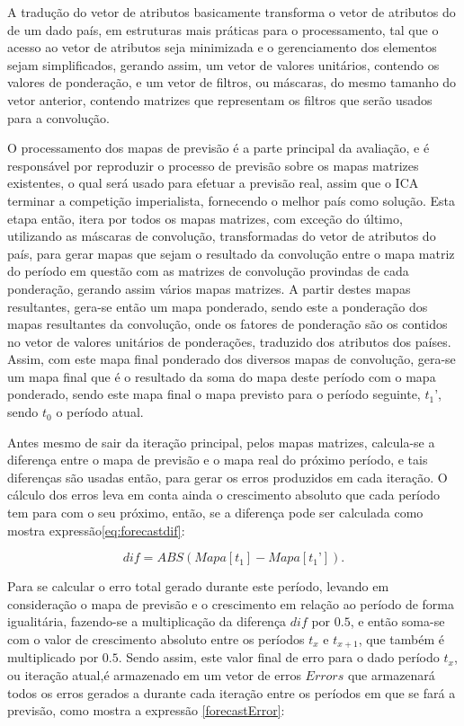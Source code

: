 A tradução do vetor de atributos basicamente transforma o vetor de atributos do de um dado país, em estruturas mais práticas para o processamento, tal que o acesso ao vetor de atributos seja minimizada e o gerenciamento dos elementos sejam simplificados, gerando assim, um vetor de valores unitários, contendo os valores de ponderação, e um vetor de filtros, ou máscaras, do mesmo tamanho do vetor anterior, contendo matrizes que representam os filtros que serão usados para a convolução.   

O processamento dos mapas de previsão é a parte principal da avaliação, e é responsável por reproduzir o processo de previsão sobre os mapas matrizes existentes, o qual será usado para efetuar a previsão real, assim que o ICA terminar a competição imperialista, fornecendo o melhor país como solução. Esta etapa então, itera por todos os mapas matrizes, com exceção do último, utilizando as máscaras de convolução, transformadas do vetor de atributos do país, para gerar mapas que sejam o resultado da convolução entre o mapa matriz do período em questão com as matrizes de convolução provindas de cada ponderação, gerando assim vários mapas matrizes. A partir destes mapas resultantes, gera-se então um mapa ponderado, sendo este a ponderação dos mapas resultantes da convolução, onde os fatores de ponderação são os contidos no vetor de valores unitários de ponderações, traduzido dos atributos dos países. Assim, com este mapa final ponderado dos diversos mapas de convolução, gera-se um mapa final que é o resultado da soma do mapa deste período com o mapa ponderado, sendo este mapa final o mapa previsto para o período seguinte, \(t_1’\), sendo \(t_0\) o período atual. 

Antes mesmo de sair da iteração principal, pelos mapas matrizes, calcula-se a diferença entre o mapa de previsão e o mapa real do próximo período, e tais diferenças são usadas então, para gerar os erros produzidos em cada iteração. O cálculo dos erros leva em conta ainda o crescimento absoluto que cada período tem para com o seu próximo, então, se a diferença pode ser calculada como mostra expressão\ref{eq:forecastdif}:

\begin{equation}
\label{eq:forecastdif}
dif = ABS( Mapa[t_1] - Mapa[t_1’] ).
\end{equation}
	
Para se calcular o erro total gerado durante este período, levando em consideração o mapa de previsão e o crescimento em relação ao período de forma igualitária, fazendo-se a multiplicação da diferença \(dif\) por \(0.5\), e então soma-se com o valor de crescimento absoluto entre os períodos \(t_x\) e \(t_{x+1}\), que também é multiplicado por \(0.5\). Sendo assim, este valor final de erro para o dado período \(t_x\), ou iteração atual,é armazenado em um vetor de erros \(Errors\) que armazenará todos os erros gerados a durante cada iteração entre os períodos em que se fará a previsão, como mostra a expressão \ref{forecastError}:

